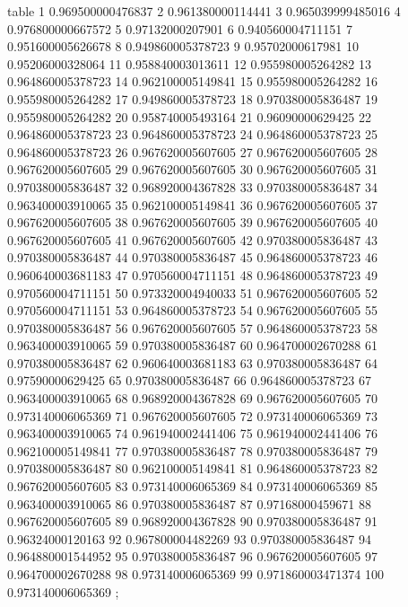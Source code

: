 table {%
	1 0.969500000476837
	2 0.961380000114441
	3 0.965039999485016
	4 0.976800000667572
	5 0.97132000207901
	6 0.940560004711151
	7 0.951600005626678
	8 0.949860005378723
	9 0.95702000617981
	10 0.95206000328064
	11 0.958840003013611
	12 0.955980005264282
	13 0.964860005378723
	14 0.962100005149841
	15 0.955980005264282
	16 0.955980005264282
	17 0.949860005378723
	18 0.970380005836487
	19 0.955980005264282
	20 0.958740005493164
	21 0.96090000629425
	22 0.964860005378723
	23 0.964860005378723
	24 0.964860005378723
	25 0.964860005378723
	26 0.967620005607605
	27 0.967620005607605
	28 0.967620005607605
	29 0.967620005607605
	30 0.967620005607605
	31 0.970380005836487
	32 0.968920004367828
	33 0.970380005836487
	34 0.963400003910065
	35 0.962100005149841
	36 0.967620005607605
	37 0.967620005607605
	38 0.967620005607605
	39 0.967620005607605
	40 0.967620005607605
	41 0.967620005607605
	42 0.970380005836487
	43 0.970380005836487
	44 0.970380005836487
	45 0.964860005378723
	46 0.960640003681183
	47 0.970560004711151
	48 0.964860005378723
	49 0.970560004711151
	50 0.973320004940033
	51 0.967620005607605
	52 0.970560004711151
	53 0.964860005378723
	54 0.967620005607605
	55 0.970380005836487
	56 0.967620005607605
	57 0.964860005378723
	58 0.963400003910065
	59 0.970380005836487
	60 0.964700002670288
	61 0.970380005836487
	62 0.960640003681183
	63 0.970380005836487
	64 0.97590000629425
	65 0.970380005836487
	66 0.964860005378723
	67 0.963400003910065
	68 0.968920004367828
	69 0.967620005607605
	70 0.973140006065369
	71 0.967620005607605
	72 0.973140006065369
	73 0.963400003910065
	74 0.961940002441406
	75 0.961940002441406
	76 0.962100005149841
	77 0.970380005836487
	78 0.970380005836487
	79 0.970380005836487
	80 0.962100005149841
	81 0.964860005378723
	82 0.967620005607605
	83 0.973140006065369
	84 0.973140006065369
	85 0.963400003910065
	86 0.970380005836487
	87 0.97168000459671
	88 0.967620005607605
	89 0.968920004367828
	90 0.970380005836487
	91 0.96324000120163
	92 0.967800004482269
	93 0.970380005836487
	94 0.964880001544952
	95 0.970380005836487
	96 0.967620005607605
	97 0.964700002670288
	98 0.973140006065369
	99 0.971860003471374
	100 0.973140006065369
};
